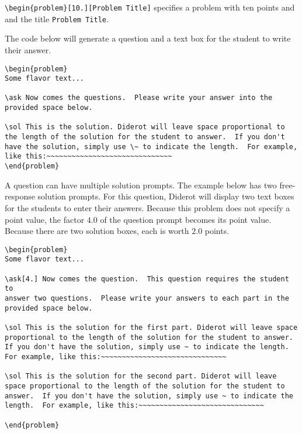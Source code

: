 %
\lstinline`\begin{problem}[10.][Problem Title]` specifies a  problem with ten points and and the title
\lstinline`Problem Title`.

\begin{example}
The code below will generate a question and a text box for the student
to write their answer.

\begin{lstlisting}
\begin{problem}
Some flavor text...

\ask Now comes the questions.  Please write your answer into the
provided space below.

\sol This is the solution. Diderot will leave space proportional to
the length of the solution for the student to answer.  If you don't
have the solution, simply use \~ to indicate the length.  For example,
like this:~~~~~~~~~~~~~~~~~~~~~~~~~~~~~~
\end{problem}
\end{lstlisting}

\end{example}

\begin{example}

A question can have multiple solution prompts.  The example below has
two free-response solution prompts. For this question, Diderot will
display two text boxes for the students to enter their answers.
%
Because this problem does not specify a point value, the factor $4.0$
of the question prompt becomes its point value.
%
Because there are two solution boxes, each is worth $2.0$ points.

\begin{lstlisting}
\begin{problem}
Some flavor text...

\ask[4.] Now comes the question.  This question requires the student to
answer two questions.  Please write your answers to each part in the
provided space below.

\sol This is the solution for the first part. Diderot will leave space
proportional to the length of the solution for the student to answer.
If you don't have the solution, simply use ~ to indicate the length.
For example, like this:~~~~~~~~~~~~~~~~~~~~~~~~~~~~~~

\sol This is the solution for the second part. Diderot will leave
space proportional to the length of the solution for the student to
answer.  If you don't have the solution, simply use ~ to indicate the
length.  For example, like this:~~~~~~~~~~~~~~~~~~~~~~~~~~~~~~

\end{problem}
\end{lstlisting}

\end{example}

